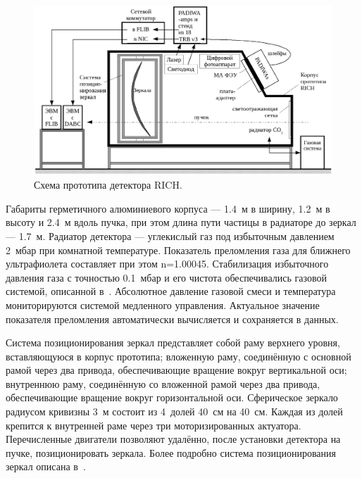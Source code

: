 \begin{figure}
\includegraphics[width=1.0\textwidth]{pictures/10_Beamtime_setup_RICH_text.png}
\caption{Схема прототипа детектора RICH.}
\label{fig:Prototype}
\end{figure}

Габариты герметичного алюминиевого корпуса --- 1.4~м в ширину, 1.2~м в высоту и 2.4~м вдоль пучка, при этом длина пути частицы в радиаторе до зеркал --- 1.7~м. Радиатор детектора --- углекислый газ под избыточным давлением 2~мбар при комнатной температуре. Показатель преломления газа для ближнего ультрафиолета составляет при этом n=1.00045. Стабилизация избыточного давления газа с точностью 0.1~мбар и его чистота обеспечивались газовой системой, описанной в~\cite{GASSYS}. Абсолютное давление газовой смеси и температура мониторируются системой медленного управления. Актуальное значение показателя преломления автоматически вычисляется и сохраняется в данных.

Система позиционирования зеркал представляет собой раму верхнего уровня, вставляющуюся в корпус прототипа; вложенную раму, соединённую с основной рамой через два привода, обеспечивающие вращение вокруг вертикальной оси; внутреннюю раму, соединённую со вложенной рамой через два привода, обеспечивающие вращение вокруг горизонтальной оси. Сферическое зеркало радиусом кривизны 3~м состоит из 4~долей 40~см на 40~см. Каждая из долей крепится к внутренней раме через три моторизированных актуатора. Перечисленные двигатели позволяют удалённо, после установки детектора на пучке, позиционировать зеркала. Более подробно система позиционирования зеркал описана в~\cite{MIRRORMIS}.

